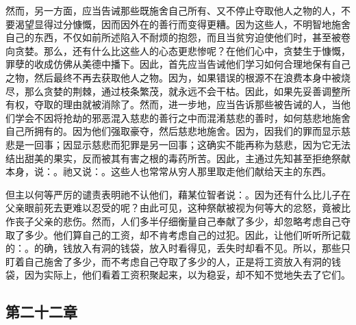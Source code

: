 然而，另一方面，应当告诫那些既施舍自己所有、又不停止夺取他人之物的人，不要渴望显得过分慷慨，因而因外在的善行而变得更糟。因为这些人，不明智地施舍自己的东西，不仅如前所述陷入不耐烦的抱怨，而且当贫穷迫使他们时，甚至被卷向贪婪。那么，还有什么比这些人的心态更悲惨呢？在他们心中，贪婪生于慷慨，罪孽的收成仿佛从美德中播下。因此，首先应当告诫他们学习如何合理地保有自己之物，然后最终不再去获取他人之物。因为，如果错误的根源不在浪费本身中被烧尽，那么贪婪的荆棘，通过枝条繁茂，就永远不会干枯。因此，如果先妥善调整所有权，夺取的理由就被消除了。然而，进一步地，应当告诉那些被告诫的人，当他们学会不因将抢劫的邪恶混入慈悲的善行之中而混淆慈悲的善时，如何慈悲地施舍自己所拥有的。因为他们强取豪夺，然后慈悲地施舍。因为，因我们的罪而显示慈悲是一回事；因显示慈悲而犯罪是另一回事；这确实不能再称为慈悲，因为它无法结出甜美的果实，反而被其有害之根的毒药所苦。因此，主通过先知甚至拒绝祭献本身，说：。祂又说：。这些人也常常从穷人那里取走他们献给天主的东西。\par

但主以何等严厉的谴责表明祂不认他们，藉某位智者说：。因为还有什么比儿子在父亲眼前死去更难以忍受的呢？由此可见，这种祭献被视为何等大的忿怒，竟被比作丧子父亲的悲伤。然而，人们多半仔细衡量自己奉献了多少，却忽略考虑自己夺取了多少。他们算自己的工资，却不肯考虑自己的过犯。因此，让他们听听所记载的：。的确，钱放入有洞的钱袋，放入时看得见，丢失时却看不见。所以，那些只盯着自己施舍了多少，而不考虑自己夺取了多少的人，正是将工资放入有洞的钱袋，因为实际上，他们看着工资积聚起来，以为稳妥，却不知不觉地失去了它们。\par


\subsection{第二十二章}

\par

